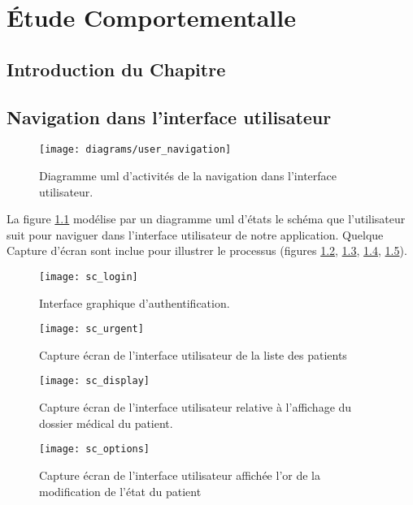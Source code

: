 \chapter{Étude Comportementalle}

\section{Introduction du Chapitre}

\section{Navigation dans l'interface utilisateur}

\begin{figure}
\center
\texttt{[image: diagrams/user\_navigation]}
\caption{Diagramme \gls{uml} d'activités de la navigation dans l'interface utilisateur.}
\label{fig:uml_act_ui}
\end{figure}

La figure \ref{fig:uml_act_ui} modélise par un diagramme \gls{uml} d'états le schéma que l'utilisateur suit pour naviguer dans l'interface utilisateur de notre application. Quelque Capture d'écran sont inclue pour illustrer le processus (figures \ref{fig:sc_login}, \ref{fig:sc_urgent}, \ref{fig:sc_display}, \ref{fig:sc_options}).

\begin{figure}
\center
\texttt{[image: sc\_login]}
\caption{Interface graphique d'authentification.}
\label{fig:sc_login}
\end{figure}

\begin{figure}
\center
\texttt{[image: sc\_urgent]}
\caption{Capture écran de l'interface utilisateur de la liste des patients}
\label{fig:sc_urgent}
\end{figure}

\begin{figure}
\center
\texttt{[image: sc\_display]}
\caption{Capture écran de l'interface utilisateur relative à l'affichage du dossier médical du patient.}
\label{fig:sc_display}
\end{figure}

\begin{figure}
\center
\texttt{[image: sc\_options]}
\caption{Capture écran de l'interface utilisateur affichée l'or de la modification de l’état du patient}
\label{fig:sc_options}
\end{figure}

